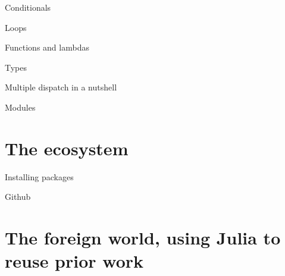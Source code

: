 \documentclass{beamer}
\begin{document}
\begin{frame}[fragile]{Conditionals}
\end{frame}
\begin{frame}[fragile]{Loops}
\end{frame}
\begin{frame}[fragile]{Functions and lambdas}
\end{frame}
\begin{frame}[fragile]{Types}
\end{frame}
\begin{frame}[fragile]{Multiple dispatch in a nutshell}
\end{frame}
\begin{frame}[fragile]{Modules}
\end{frame}
\section{The ecosystem}
\begin{frame}{Installing packages}
\end{frame}
\begin{frame}{Github}
\end{frame}
\section{The foreign world, using Julia to reuse prior work}
\end{document}
